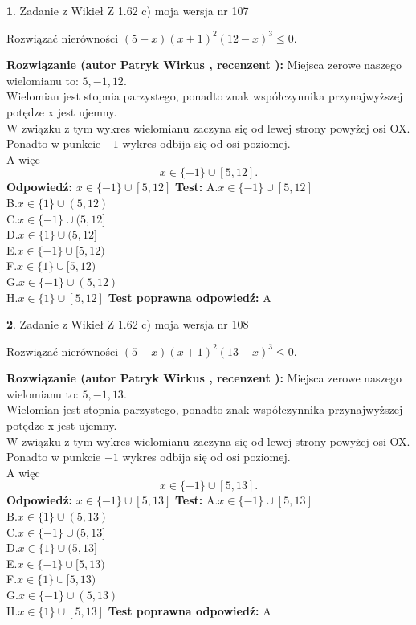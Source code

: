 \documentclass[12pt, a4paper]{article}
\theoremstyle{definition} %
\newtheorem{zad}{}
\newcommand{\zadStart}[1]{\begin{zad}#1\newline}
\newcommand{\zadStop}{\end{zad}}
\newcommand{\rozwStart}[2]{\noindent \textbf{Rozwiązanie (autor #1 , recenzent #2): }\newline}
\newcommand{\rozwStop}{\newline}
\newcommand{\odpStart}{\noindent \textbf{Odpowiedź:}\newline}
\newcommand{\odpStop}{\newline}
\newcommand{\testStart}{\noindent \textbf{Test:}\newline}
\newcommand{\testStop}{\newline}
\newcommand{\kluczStart}{\noindent \textbf{Test poprawna odpowiedź:}\newline}
\newcommand{\kluczStop}{\newline}
\begin{document}
\zadStart{Zadanie z Wikieł Z 1.62 c) moja wersja nr 107}

Rozwiązać nierówności $(5-x)(x+1)^{2}(12-x)^{3}\le0$.
\zadStop
\rozwStart{Patryk Wirkus}{}
Miejsca zerowe naszego wielomianu to: $5, -1, 12$.\\
Wielomian jest stopnia parzystego, ponadto znak współczynnika przy\linebreak najwyższej potędze x jest ujemny.\\ W związku z tym wykres wielomianu zaczyna się od lewej strony powyżej osi OX.\\
Ponadto w punkcie $-1$ wykres odbija się od osi poziomej.\\
A więc $$x \in \{-1\} \cup [5,12].$$
\rozwStop
\odpStart
$x \in \{-1\} \cup [5,12]$
\odpStop
\testStart
A.$x \in \{-1\} \cup [5,12]$\\
B.$x \in \{1\} \cup (5,12)$\\
C.$x \in \{-1\} \cup (5,12]$\\
D.$x \in \{1\} \cup (5,12]$\\
E.$x \in \{-1\} \cup [5,12)$\\
F.$x \in \{1\} \cup [5,12)$\\
G.$x \in \{-1\} \cup (5,12)$\\
H.$x \in \{1\} \cup [5,12]$
\testStop
\kluczStart
A
\kluczStop



\zadStart{Zadanie z Wikieł Z 1.62 c) moja wersja nr 108}

Rozwiązać nierówności $(5-x)(x+1)^{2}(13-x)^{3}\le0$.
\zadStop
\rozwStart{Patryk Wirkus}{}
Miejsca zerowe naszego wielomianu to: $5, -1, 13$.\\
Wielomian jest stopnia parzystego, ponadto znak współczynnika przy\linebreak najwyższej potędze x jest ujemny.\\ W związku z tym wykres wielomianu zaczyna się od lewej strony powyżej osi OX.\\
Ponadto w punkcie $-1$ wykres odbija się od osi poziomej.\\
A więc $$x \in \{-1\} \cup [5,13].$$
\rozwStop
\odpStart
$x \in \{-1\} \cup [5,13]$
\odpStop
\testStart
A.$x \in \{-1\} \cup [5,13]$\\
B.$x \in \{1\} \cup (5,13)$\\
C.$x \in \{-1\} \cup (5,13]$\\
D.$x \in \{1\} \cup (5,13]$\\
E.$x \in \{-1\} \cup [5,13)$\\
F.$x \in \{1\} \cup [5,13)$\\
G.$x \in \{-1\} \cup (5,13)$\\
H.$x \in \{1\} \cup [5,13]$
\testStop
\kluczStart
A
\kluczStop
\end{document}
